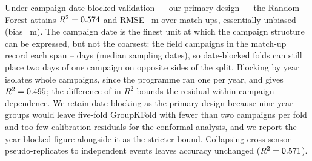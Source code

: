 \documentclass[preprint,review,12pt,authoryear]{elsarticle}
\newcommand{\tabfit}{\small\setlength{\tabcolsep}{4pt}\renewcommand{\arraystretch}{1.08}}
\begin{document}
Under campaign-date-blocked validation --- our primary design --- the Random
Forest attains $R^2=0.574$ and RMSE \numHeadlineRmse~m over
\numHeadlineN{} match-ups, essentially unbiased (bias \numHeadlineBias~m).
The campaign date is the finest unit at which the campaign structure can be
expressed, but not the coarsest: the \numFieldCampaignsN{} field campaigns in
the match-up record each span \numCampaignSpanMinDays--\numCampaignSpanMaxDays{}
days (median \numCampaignDatesMedian{} sampling dates), so date-blocked folds
can still place two days of one campaign on opposite sides of the split.
Blocking by year isolates whole campaigns, since the programme ran one per
year, and gives $R^2=0.495$; the difference of \numDateVsYearGapRTwo{}
in $R^2$ bounds the residual within-campaign dependence. We retain date
blocking as the primary design because nine year-groups would leave five-fold
GroupKFold with fewer than two campaigns per fold and too few calibration
residuals for the conformal analysis, and we report the year-blocked figure
alongside it as the stricter bound. Collapsing cross-sensor pseudo-replicates
to \numOneEventN{} independent events leaves accuracy unchanged
($R^2=0.571$).

\begin{table}[htbp]
\caption{Retrieval under each validation design (Random Forest, $n=812$
unless noted). Null models are in Table~\ref{tab:nullgrid}.}\label{tab:blocking}
\tabfit
\centering
{}
\end{table}
\end{document}
